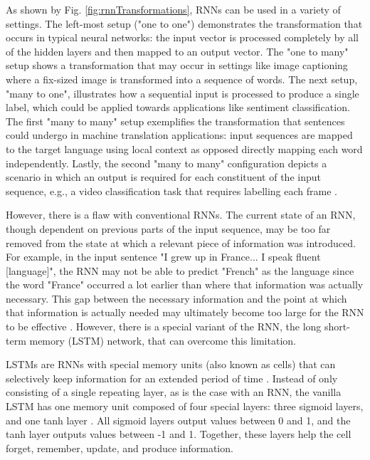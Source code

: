 As shown by Fig. \ref{fig:rnnTransformations}, RNNs can be used in a variety of settings.  The left-most setup ("one to one") demonstrates the transformation that occurs in typical neural networks: the input vector is processed completely by all of the hidden layers and then mapped to an output vector.  The "one to many" setup shows a transformation that may occur in settings like image captioning where a fix-sized image is transformed into a sequence of words.  The next setup, "many to one", illustrates how a sequential input is processed to produce a single label, which could be applied towards applications like sentiment classification.  The first "many to many" setup exemplifies the transformation that sentences could undergo in machine translation applications: input sequences are mapped to the target language using local context as opposed directly mapping each word independently.  Lastly, the second "many to many" configuration depicts a scenario in which an output is required for each constituent of the input sequence, e.g., a video classification task that requires labelling each frame \cite{rnnTransformations}.

However, there is a flaw with conventional RNNs.  The current state of an RNN, though dependent on previous parts of the input sequence, may be too far removed from the state at which a relevant piece of information was introduced.  For example, in the input sentence "I grew up in France... I speak fluent [language]", the RNN may not be able to predict "French" as the language since the word "France" occurred a lot earlier than where that information was actually necessary.  This gap between the necessary information and the point at which that information is actually needed may ultimately become too large for the RNN to be effective \cite{lstm}.  However, there is a special variant of the RNN, the long short-term memory (LSTM) network, that can overcome this limitation.

LSTMs are RNNs with special memory units (also known as cells) that can selectively keep information for an extended period of time \cite{lstmClassification}.  Instead of only consisting of a single repeating layer, as is the case with an RNN, the vanilla LSTM has one memory unit composed of four special layers: three sigmoid layers, and one tanh layer \cite{lstm}.  All sigmoid layers output values between 0 and 1, and the tanh layer outputs values between -1 and 1.  Together, these layers help the cell forget, remember, update, and produce information.

